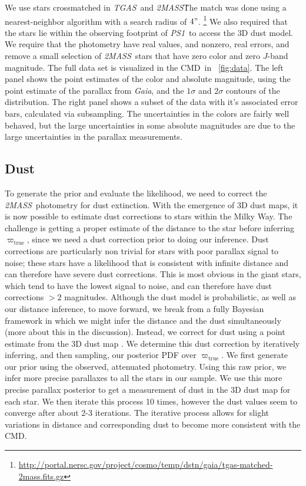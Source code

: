 \documentclass[modern]{aastex61}
\newcommand{\acronym}[1]{{\small{#1}}}
\newcommand{\project}[1]{\textsl{#1}}
\newcommand{\tgas}{\project{\acronym{TGAS}}}
\newcommand{\tmass}{\project{\acronym{2MASS}}}
\newcommand{\psone}{\project{\acronym{PS1}}}
\newcommand{\gaia}{\project{Gaia}}
\newcommand{\cmd}{\acronym{CMD}}
\newcommand{\true}{\mathrm{true}}
\begin{document}
We use stars crossmatched in \tgas\ and \tmass\.
The match was done using a nearest-neighbor algorithm with a search radius of $4"$.
\footnote{\url{http://portal.nersc.gov/project/cosmo/temp/dstn/gaia/tgas-matched-2mass.fits.gz}}
We also required that the stars lie within the
observing footprint of \psone\ to access the \cite{green15} 3D dust model.
We require that the photometry have real values, and nonzero, real errors, and
remove a small selection of \tmass\ stars that have zero color and zero $J$-band
magnitude.
The full data set is visualized in the \cmd\ in \figurename~\ref{fig:data}.
The left panel shows the point estimates of the color and absolute magnitude,
using the point estimate of the parallax from \gaia, and the $1\sigma$ and
$2\sigma$ contours of the distribution.
The right panel shows a subset of the data with it's associated error bars, calculated via subsampling.
The uncertainties in the colors are fairly well behaved, but the large
uncertainties in some absolute magnitudes are due to the large uncertainties in
the parallax measurements.

\subsection{Dust}

To generate the prior and evaluate the likelihood, we need to
correct the \tmass\ photometry for dust extinction.
With the emergence of 3D dust maps, it is now possible to estimate dust
corrections to stars within the Milky Way. The challenge is getting a
proper estimate of the distance to the star before inferring
$\varpi_{\true}$, since we need a dust correction prior to doing our
inference. Dust corrections are particularly non trivial for stars
with poor parallax signal to noise; these stars have
a likelihood that is consistent with infinite distance and can
therefore have severe dust corrections. This is most obvious in the
giant stars, which tend to have the lowest signal to noise, and can
therefore have dust corrections $> 2$ magnitudes. Although the dust
model is probabilistic, as well as our distance inference, to move
forward, we break from a fully Bayesian framework in which we might
infer the distance and the dust simultaneously (more about this in the
discussion). Instead, we correct for dust using a point estimate from
the 3D dust map \citep{green15}. We determine this dust correction by
iteratively inferring, and then sampling, our posterior PDF over
$\varpi_{\true}$. We first generate our prior using the observed,
attenuated photometry. Using this raw prior, we infer more precise
parallaxes to all the stars in our sample. We use this more
precise parallax posterior to get a measurement of dust in the 3D dust
map for each star. We then iterate this process 10 times, however
the dust values seem to converge after about 2-3 iterations. The
iterative process allows for slight variations in distance and
corresponding dust to become more consistent with the \cmd.
\end{document}
